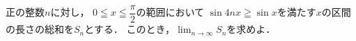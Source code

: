 \documentclass[../../main.tex]{subfiles}
\begin{document}
正の整数$n$に対し，
$\displaystyle 0 \leqq x \leqq \dfrac{\pi}{2}$の範囲において
$\sin4nx\geqq\sin x$を満たす$x$の区間の長さの総和を$S_n$とする．
このとき，$\displaystyle\lim_{n\to\infty}S_n$を求めよ．
\end{document}
